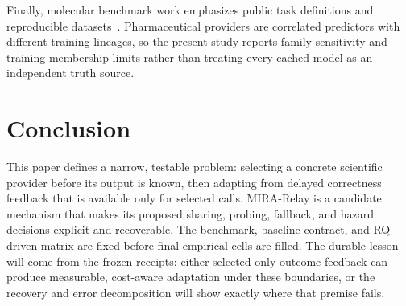 \documentclass[sigconf,anonymous]{aamas}
\begin{document}
Finally, molecular benchmark work emphasizes public task definitions and reproducible datasets~\cite{huang2021tdc,wu2018moleculenet}. Pharmaceutical providers are correlated predictors with different training lineages, so the present study reports family sensitivity and training-membership limits rather than treating every cached model as an independent truth source.

\section{Conclusion}
This paper defines a narrow, testable problem: selecting a concrete scientific provider before its output is known, then adapting from delayed correctness feedback that is available only for selected calls. MIRA-Relay is a candidate mechanism that makes its proposed sharing, probing, fallback, and hazard decisions explicit and recoverable. The benchmark, baseline contract, and RQ-driven matrix are fixed before final empirical cells are filled. The durable lesson will come from the frozen receipts: either selected-only outcome feedback can produce measurable, cost-aware adaptation under these boundaries, or the recovery and error decomposition will show exactly where that premise fails.

\balance


\end{document}
